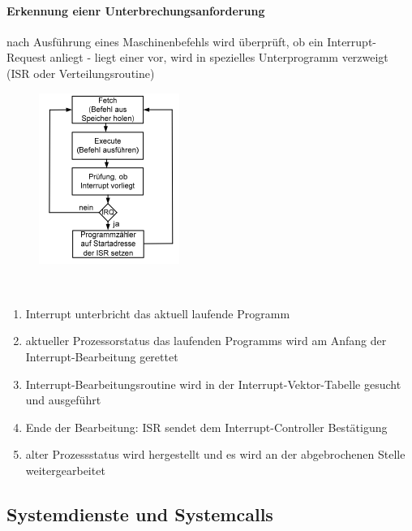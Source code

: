 \documentclass[11pt,a4paper,landscape]{article}
\begin{document}
\begin{multicols*}{3}
	\paragraph{Erkennung eienr Unterbrechungsanforderung} nach Ausführung eines Maschinenbefehls wird überprüft, ob ein Interrupt-Request anliegt - liegt einer vor, wird in spezielles Unterprogramm verzweigt (ISR oder Verteilungsroutine)\\
	\begin{figure}
		\includegraphics[width=0.45\columnwidth,height=0.21\textheight]{interrupt_fetch}
	\end{figure}
	\begin{description}[labelindent=0.0cm]
		\item[Prüfung, ob Interrupt vorliegt]~\par
		\begin{enumerate}[leftmargin=0.0cm]
			\item Interrupt unterbricht das aktuell laufende Programm
			\item aktueller Prozessorstatus das laufenden Programms wird am Anfang der Interrupt-Bearbeitung gerettet
			\item Interrupt-Bearbeitungsroutine wird in der Interrupt-Vektor-Tabelle gesucht und ausgeführt
			\item Ende der Bearbeitung: ISR sendet dem Interrupt-Controller Bestätigung
			\item alter Prozessstatus wird hergestellt und es wird an der abgebrochenen Stelle weitergearbeitet
		\end{enumerate}
	\end{description}
	\subsection{Systemdienste und Systemcalls}

\end{multicols*}
\end{document}
